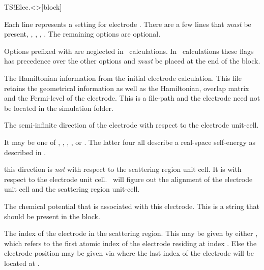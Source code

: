 \begin{fdfentry}{TS!Elec.<>}[block]

  Each line represents a setting for electrode \fdf*{<>}.
  There are a few lines that \emph{must} be present, ,
  , , . The
  remaining options are optional.

  \note Options prefixed with  are neglected in \tsiesta\
  calculations. In \tbtrans\ calculations these flags has precedence
  over the other options and \emph{must} be placed at the end of the
  block.

  \begin{fdfoptions}

    \option[HS]%
    The Hamiltonian information from the initial electrode
    calculation. This file retains the geometrical information as well
    as the Hamiltonian, overlap matrix and the Fermi-level of the
    electrode. 
    This is a file-path and the electrode  need not be
    located in the simulation folder.

    The semi-infinite direction of the electrode with respect to the
    electrode unit-cell.

    It may be one of \fdf*{[-+][abc]}, , ,
    \fdf*{ac}, \fdf*{bc} or \fdf*{abc}. The latter four all describe a
    real-space self-energy as described in \cite{Papior2019}.

    \note this direction is \emph{not} with respect to the scattering
    region unit cell. It is with respect to the electrode unit
    cell. \tsiesta\ will figure out the alignment of the electrode
    unit cell and the scattering region unit-cell.

    The chemical potential that is associated with this
    electrode. This is a string that should be present in the
     block.

    The index of the electrode in the scattering region.
    This may be given by either , which refers to
    the first atomic index of the electrode residing at index
    . Else the electrode position may be given via
     where the last index of the electrode
    will be located at \fdf*{<idx>}.


\end{fdfoptions}
\end{fdfentry}
